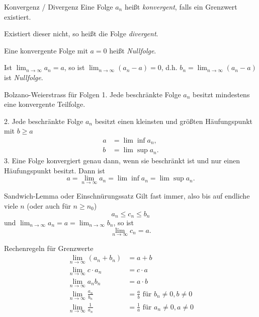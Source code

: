 \documentclass[german]{../spicker}
\begin{document}
\begin{defi}{Konvergenz / Divergenz}
    Eine Folge $a_n$ heißt \emph{konvergent}, falls ein Grenzwert existiert.

    Existiert dieser nicht, so heißt die Folge \emph{divergent}.

    Eine konvergente Folge mit $a=0$ heißt \emph{Nullfolge}.

    Ist $\lim_{n\to\infty}a_n = a$, so ist $\lim_{n\to\infty}(a_n-a) = 0$, d.h. $b_n=\lim_{n\to\infty}(a_n-a)$ ist \emph{Nullfolge}.
\end{defi}

\begin{defi}{Bolzano-Weierstrass für Folgen}
    1. Jede beschränkte Folge $a_n$ besitzt mindestens eine konvergente Teilfolge.

    2. Jede beschränkte Folge $a_n$ besitzt einen kleinsten und größten Häufungspunkt mit $b \geq a$
    $$
        \begin{aligned}
            a & = \lim\inf a_n, \\
            b & = \lim\sup a_n.
        \end{aligned}
    $$
    3. Eine Folge konvergiert genau dann, wenn sie beschränkt ist und nur einen Häufungspunkt besitzt. Dann ist
    $$
        a = \lim_{n\to\infty} a_n = \lim\inf a_n = \lim\sup a_n.
    $$
\end{defi}

\begin{defi}{Sandwich-Lemma oder Einschnürungssatz}
    Gilt fast immer, also bis auf endliche viele $n$ (oder auch für $n \geq n_0$)
    $$
        a_n \leq c_n \leq b_n
    $$
    und $\lim_{n\to\infty}a_n = a = \lim_{n\to\infty}b_n$, so ist
    $$
        \lim_{n\to\infty}c_n = a.
    $$
\end{defi}

\begin{bonus}{Rechenregeln für Grenzwerte}
    $$
        \begin{aligned}
            \lim_{n\to\infty} (a_n + b_n)     & = a+b                                          \\
            \lim_{n\to\infty} c\cdot a_n      & = c \cdot a                                    \\
            \lim_{n\to\infty} a_nb_n          & = a \cdot b                                    \\
            \lim_{n\to\infty} \frac{a_n}{b_n} & = \frac{a}{b} \text{ für } b_n \neq 0, b\neq 0 \\
            \lim_{n\to\infty} \frac{1}{a_n}   & = \frac{1}{a} \text{ für } a_n \neq 0, a\neq 0
        \end{aligned}
    $$
\end{bonus}
\end{document}
